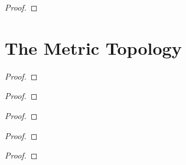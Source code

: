 \begin{exercise}\label{chapter2:section19:exercise10}
\end{exercise}

\begin{proof}
\end{proof}


\section{The Metric Topology}

\begin{exercise}\label{chapter2:section20:exercise1}
\end{exercise}

\begin{proof}
\end{proof}


\begin{exercise}\label{chapter2:section20:exercise2}
\end{exercise}

\begin{proof}
\end{proof}


\begin{exercise}\label{chapter2:section20:exercise3}
\end{exercise}

\begin{proof}
\end{proof}


\begin{exercise}\label{chapter2:section20:exercise4}
\end{exercise}

\begin{proof}
\end{proof}


\begin{exercise}\label{chapter2:section20:exercise5}
\end{exercise}

\begin{proof}
\end{proof}


\begin{exercise}\label{chapter2:section20:exercise6}
\end{exercise}

